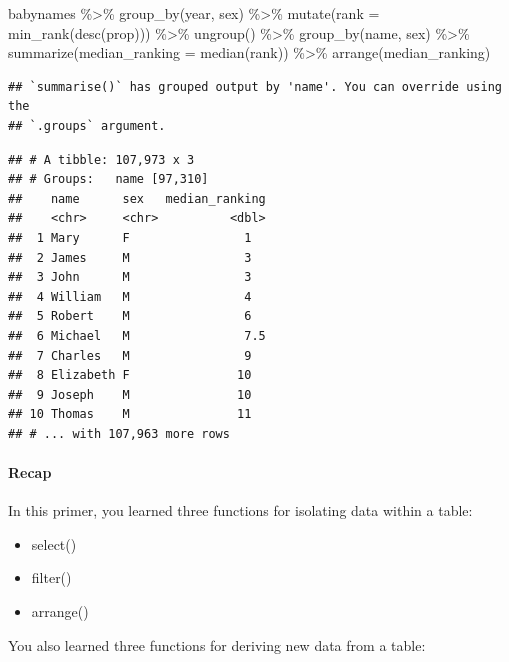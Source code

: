 \documentclass[
]{article}
\newenvironment{Shaded}{\begin{snugshade}}{\end{snugshade}}
\newcommand{\AttributeTok}[1]{\textcolor[rgb]{0.77,0.63,0.00}{#1}}
\newcommand{\FunctionTok}[1]{\textcolor[rgb]{0.00,0.00,0.00}{#1}}
\newcommand{\NormalTok}[1]{#1}
\newcommand{\SpecialCharTok}[1]{\textcolor[rgb]{0.00,0.00,0.00}{#1}}
\providecommand{\tightlist}{%
  \setlength{\itemsep}{0pt}\setlength{\parskip}{0pt}}
\begin{document}
\begin{Shaded}
\begin{Highlighting}[]
\NormalTok{babynames }\SpecialCharTok{\%\textgreater{}\%}
  \FunctionTok{group\_by}\NormalTok{(year, sex) }\SpecialCharTok{\%\textgreater{}\%}
  \FunctionTok{mutate}\NormalTok{(}\AttributeTok{rank =} \FunctionTok{min\_rank}\NormalTok{(}\FunctionTok{desc}\NormalTok{(prop))) }\SpecialCharTok{\%\textgreater{}\%}
  \FunctionTok{ungroup}\NormalTok{() }\SpecialCharTok{\%\textgreater{}\%}
  \FunctionTok{group\_by}\NormalTok{(name, sex) }\SpecialCharTok{\%\textgreater{}\%}
  \FunctionTok{summarize}\NormalTok{(}\AttributeTok{median\_ranking =} \FunctionTok{median}\NormalTok{(rank)) }\SpecialCharTok{\%\textgreater{}\%}
  \FunctionTok{arrange}\NormalTok{(median\_ranking)}
\end{Highlighting}
\end{Shaded}

\begin{verbatim}
## `summarise()` has grouped output by 'name'. You can override using the
## `.groups` argument.
\end{verbatim}

\begin{verbatim}
## # A tibble: 107,973 x 3
## # Groups:   name [97,310]
##    name      sex   median_ranking
##    <chr>     <chr>          <dbl>
##  1 Mary      F                1  
##  2 James     M                3  
##  3 John      M                3  
##  4 William   M                4  
##  5 Robert    M                6  
##  6 Michael   M                7.5
##  7 Charles   M                9  
##  8 Elizabeth F               10  
##  9 Joseph    M               10  
## 10 Thomas    M               11  
## # ... with 107,963 more rows
\end{verbatim}

\hypertarget{recap-2}{%
\paragraph{Recap}\label{recap-2}}

In this primer, you learned three functions for isolating data within a
table:

\begin{itemize}
\tightlist
\item
  select()
\item
  filter()
\item
  arrange()
\end{itemize}

You also learned three functions for deriving new data from a table:
\end{document}
